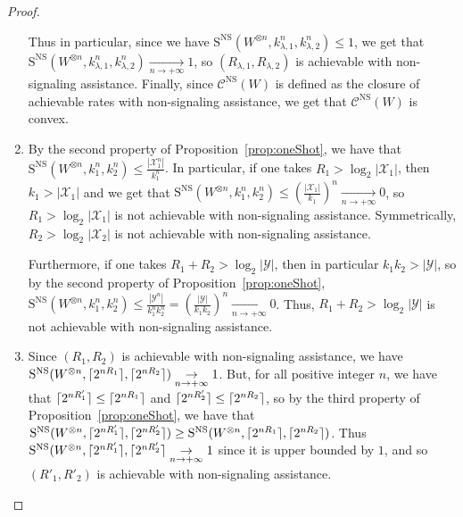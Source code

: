 \documentclass[11pt]{article}
\theoremstyle{definition}
\theoremstyle{remark}
\DeclarePairedDelimiter\ceil{\lceil}{\rceil}
\begin{document}
\begin{proof}
\begin{enumerate}
    Thus in particular, since we have $\mathrm{S}^{\mathrm{NS}}(W^{\otimes n},k^n_{\lambda,1},k^n_{\lambda,2}) \leq 1$, we get that $\mathrm{S}^{\mathrm{NS}}(W^{\otimes n},k^n_{\lambda,1},k^n_{\lambda,2}) \underset{n \rightarrow +\infty}{\rightarrow} 1$, so $(R_{\lambda,1},R_{\lambda,2})$ is achievable with non-signaling assistance. Finally, since $\mathcal{C}^{\mathrm{NS}}(W)$ is defined as the closure of achievable rates with non-signaling assistance, we get that $\mathcal{C}^{\mathrm{NS}}(W)$ is convex.
    
  \item By the second property of Proposition~\ref{prop:oneShot}, we have that $\mathrm{S}^{\mathrm{NS}}(W^{\otimes n},k_1^n,k_2^n) \leq \frac{|\mathcal{X}_1^n|}{k_1^n}$. In particular, if one takes $R_1 > \log_2 |\mathcal{X}_1|$, then $k_1 > |\mathcal{X}_1|$ and we get that $\mathrm{S}^{\mathrm{NS}}(W^{\otimes n},k_1^n,k_2^n) \leq \left(\frac{|\mathcal{X}_1|}{k_1}\right)^n \underset{n \rightarrow +\infty}{\rightarrow} 0$, so $R_1 > \log_2 |\mathcal{X}_1|$ is not achievable with non-signaling assistance. Symmetrically, $R_2 > \log_2 |\mathcal{X}_2|$ is not achievable with non-signaling assistance.

    Furthermore, if one takes $R_1+R_2 > \log_2|\mathcal{Y}|$, then in particular $k_1k_2 > |\mathcal{Y}|$, so by the second property of Proposition~\ref{prop:oneShot}, $\mathrm{S}^{\mathrm{NS}}(W^{\otimes n},k_1^n,k_2^n) \leq \frac{|\mathcal{Y}^n|}{k_1^nk_2^n} = \left(\frac{|\mathcal{Y}|}{k_1k_2}\right)^n \underset{n \rightarrow +\infty}{\rightarrow} 0$. Thus, $R_1+R_2 > \log_2|\mathcal{Y}|$ is not achievable with non-signaling assistance.
    
  \item Since $(R_1,R_2)$ is achievable with non-signaling assistance, we have $\mathrm{S}^{\mathrm{NS}}(W^{\otimes n},\ceil{2^{nR_1}},\ceil{2^{nR_2}}) \underset{n \rightarrow +\infty}{\rightarrow} 1$. But, for all positive integer $n$, we have that $\ceil{2^{nR'_1}} \leq \ceil{2^{nR_1}}$ and $\ceil{2^{nR'_2}}\leq \ceil{2^{nR_2}}$, so by the third property of Proposition~\ref{prop:oneShot}, we have that $\mathrm{S}^{\mathrm{NS}}(W^{\otimes n},\ceil{2^{nR'_1}},\ceil{2^{nR'_2}}) \geq \mathrm{S}^{\mathrm{NS}}(W^{\otimes n},\ceil{2^{nR_1}},\ceil{2^{nR_2}})$. Thus $\mathrm{S}^{\mathrm{NS}}(W^{\otimes n},\ceil{2^{nR'_1}},\ceil{2^{nR'_2}} \underset{n \rightarrow +\infty}{\rightarrow} 1$ since it is upper bounded by $1$, and so $(R'_1,R'_2)$ is achievable with non-signaling assistance.
  \end{enumerate}
\end{proof}
\end{document}
